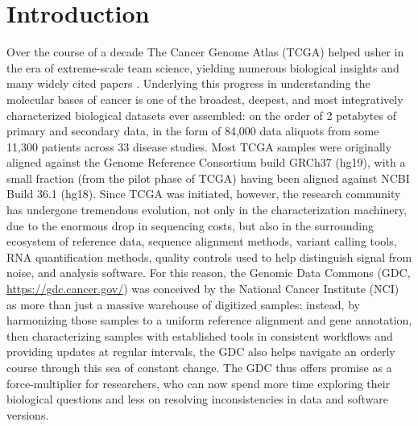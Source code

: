 \section{Introduction}
Over the course of a decade The Cancer Genome Atlas (TCGA) helped usher in the era of extreme-scale team science, yielding numerous biological insights and many widely cited papers \cite{hutterc_zenklusenjc:CancerGenome2018}. Underlying this progress in understanding the molecular bases of cancer is one of the broadest, deepest, and most integratively characterized biological datasets ever assembled: on the order of 2 petabytes of primary and secondary data, in the form of 84,000 data aliquots from some 11,300 patients across 33 disease studies. Most TCGA samples were originally aligned against the Genome Reference Consortium build GRCh37 (hg19), with a small fraction (from the pilot phase of TCGA) having been aligned against NCBI Build 36.1 (hg18). Since TCGA was initiated, however, the research community has undergone tremendous evolution, not only in the characterization machinery, due to the enormous drop in sequencing costs, but also in the surrounding ecosystem of reference data, sequence alignment methods, variant calling tools, RNA quantification methods, quality controls used to help distinguish signal from noise, and analysis software. For this reason, the Genomic Data Commons (GDC, \url{https://gdc.cancer.gov/}) was conceived by the National Cancer Institute (NCI) as more than just a massive warehouse of digitized samples: instead, by harmonizing those samples to a uniform reference alignment and gene annotation, then characterizing samples with established tools in consistent workflows and providing updates at regular intervals, the GDC also helps navigate an orderly course through this sea of constant change. The GDC thus offers promise as a force-multiplier for researchers, who can now spend more time exploring their biological questions and less on resolving inconsistencies in data and software versions.

